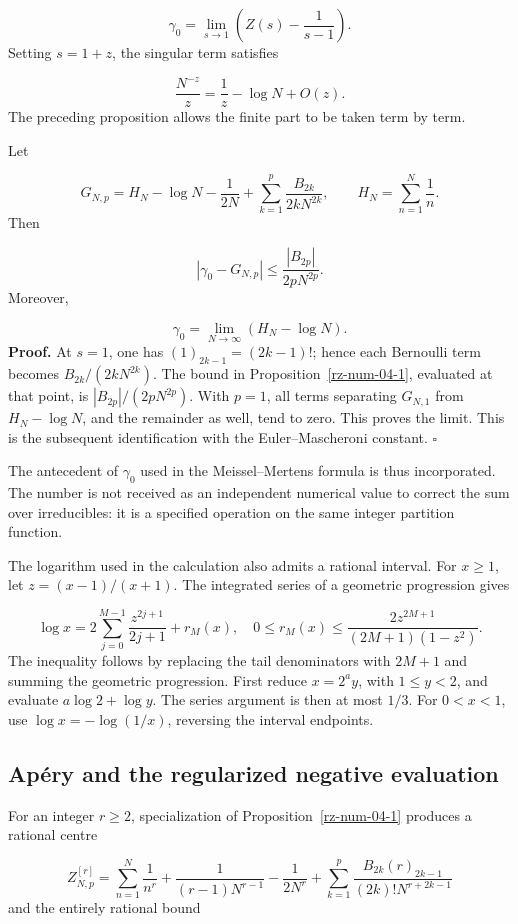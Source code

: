 \[
\gamma_0=\lim_{s\to1}\left(Z(s)-\frac1{s-1}\right).
\]
Setting \(s=1+z\), the singular term satisfies

\[
\frac{N^{-z}}z=\frac1z-\log N+O(z).
\]
The preceding proposition allows the finite part to be taken term by term.

Let

\[
G_{N,p}=H_N-\log N-\frac1{2N}
+\sum_{k=1}^p\frac{B_{2k}}{2kN^{2k}},
\qquad H_N=\sum_{n=1}^N\frac1n.
\]
Then

\[
|\gamma_0-G_{N,p}|\leq\frac{|B_{2p}|}{2pN^{2p}}.
\]
Moreover,

\[
\gamma_0=\lim_{N\to\infty}(H_N-\log N).
\]
\textbf{Proof.} At \(s=1\), one has \((1)_{2k-1}=(2k-1)!\); hence each Bernoulli term becomes \(B_{2k}/(2kN^{2k})\). The bound in Proposition~\ref{rz-num-04-1}, evaluated at that point, is \(|B_{2p}|/(2pN^{2p})\). With \(p=1\), all terms separating \(G_{N,1}\) from \(H_N-\log N\), and the remainder as well, tend to zero. This proves the limit. This is the subsequent identification with the Euler–Mascheroni constant. \hfill\(\square\)

The antecedent of \(\gamma_0\) used in the Meissel–Mertens formula is thus incorporated. The number is not received as an independent numerical value to correct the sum over irreducibles: it is a specified operation on the same integer partition function.

The logarithm used in the calculation also admits a rational interval. For \(x\geq1\), let \(z=(x-1)/(x+1)\). The integrated series of a geometric progression gives

\[
\log x=2\sum_{j=0}^{M-1}\frac{z^{2j+1}}{2j+1}+r_M(x),
\quad
0\leq r_M(x)\leq
\frac{2z^{2M+1}}{(2M+1)(1-z^2)}.
\]
The inequality follows by replacing the tail denominators with \(2M+1\) and summing the geometric progression. First reduce \(x=2^a y\), with \(1\leq y<2\), and evaluate \(a\log2+\log y\). The series argument is then at most \(1/3\). For \(0<x<1\), use \(\log x=-\log(1/x)\), reversing the interval endpoints.

\subsection{Apéry and the regularized negative evaluation}
For an integer \(r\geq2\), specialization of Proposition~\ref{rz-num-04-1} produces a rational centre

\[
Z_{N,p}^{[r]}=
\sum_{n=1}^N\frac1{n^r}+\frac1{(r-1)N^{r-1}}-\frac1{2N^r}
+\sum_{k=1}^p\frac{B_{2k}(r)_{2k-1}}{(2k)!N^{r+2k-1}}
\]
and the entirely rational bound

